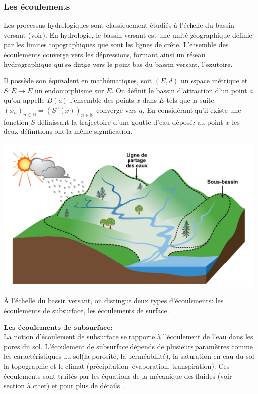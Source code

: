 \documentclass[a4paper,10pt]{article}
\begin{document}
	\subsubsection{Les écoulements}
	
	Les processus hydrologiques sont classiquement étudiés à l’échelle du bassin versant (voir). En hydrologie, le bassin versant est une unité géographique définie par les limites topographiques que sont les lignes de crête. L’ensemble des écoulements converge vers les dépressions, formant ainsi un réseau hydrographique qui se dirige vers le point bas du bassin versant, l’exutoire.
	
	Il possède son équivalent en mathématiques, soit $(E,d)$ un espace métrique et $S:E\to E$ un endomorphisme sur $E$. On définit le bassin d'attraction d'un point $a$ qu'on appelle $B(a)$ l'ensemble des points $x$ dans $E$ tels que la suite $(x_n)_{n \in \mathbb{N}}=(S^n(x))_{n \in \mathbb{N}}$ converge vers $a$. En considérant qu'il existe une fonction $S$ définissant la trajectoire d'une goutte d'eau déposée au point $x$ les deux définitions ont la même signification.
	
	\begin{center}
		\includegraphics[scale=0.15]{bassin_versant.png}
	\end{center} 
	
	À l’échelle du bassin versant, on distingue deux types d’écoulements: les écoulements de subsurface, les écoulements de surface. 
	
	\textbf{Les écoulements de subsurface}:\\
	
	La notion d'écoulement de subsurface se rapporte à l'écoulement de l'eau dans les pores du sol. L'écoulement de subsurface dépends de plusieurs paramètres comme les caractéristiques du sol(la porosité, la perméabilité), la saturation en eau du sol la topographie et le climat (précipitation, évaporation, transpiration). Ces écoulements sont traités par les équations de la mécanique des fluides (voir section  à citer) et pour plus de détails \cite{de1986quantitative}. 
	
\end{document}
